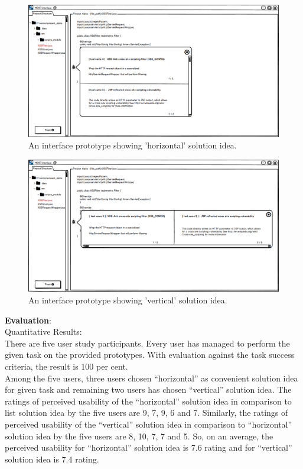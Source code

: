 \begin{figure}[hbt!]
	\centering
	\includegraphics[width=\linewidth]{figures/solution_ideas_snaps/S31_horizontal}
	\caption{An interface prototype showing 'horizontal' solution idea.}
	\label{fig:S31_horizontal}
\end{figure} 


\begin{figure}[hbt!]
	\centering
	\includegraphics[width=\linewidth]{figures/solution_ideas_snaps/S31_vertical}
	\caption{An interface prototype showing 'vertical' solution idea.}
	\label{fig:S31_vertical}
\end{figure} 


\textbf{Evaluation}: \\

Quantitative Results: \\

There are five user study participants. Every user has managed to perform the given task on the provided prototypes. With evaluation against the task success criteria, the result is 100 per cent. \\

Among the five users, three users chosen “horizontal” as convenient solution idea for given task and remaining two users has chosen “vertical” solution idea. The ratings of perceived usability of the “horizontal” solution idea in comparison to list solution idea by the five users are 9, 7, 9, 6 and 7. Similarly, the ratings of perceived usability of the “vertical” solution idea in comparison to “horizontal” solution idea by the five users are 8, 10, 7, 7 and 5. So, on an average, the perceived usability for “horizontal” solution idea is 7.6 rating and for “vertical” solution idea is 7.4 rating. \\

